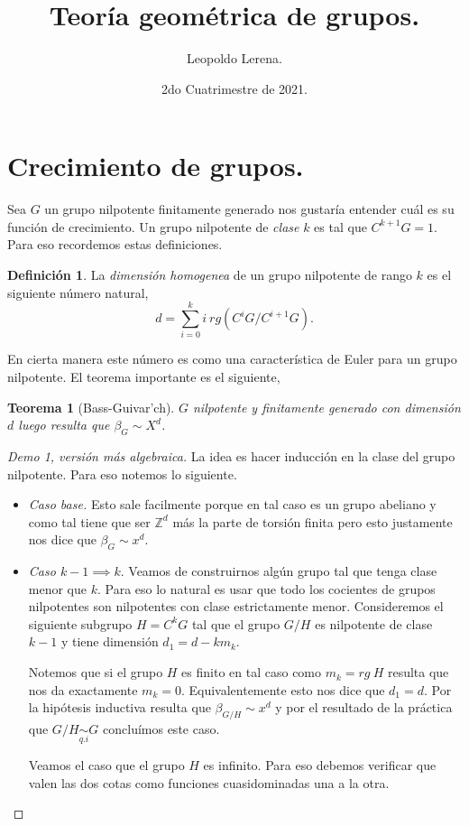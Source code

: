 \documentclass[11pt]{article}
\title{\color{red!55!black} Teoría geométrica de grupos.}
\author{Leopoldo Lerena.}
\date{2do Cuatrimestre de 2021.}
\theoremstyle{plain}
\newtheorem{teo}{Teorema}
\theoremstyle{definition}
\newtheorem*{deff}{Definición}
\theoremstyle{remark}
\newcommand\fg{finitamente generado }
\newcommand\ZZ{\mathbb{Z}}
\begin{document}
\maketitle
\section{Crecimiento de grupos.}
Sea $G$ un grupo nilpotente \fg nos gustaría entender cuál es su función de crecimiento. Un grupo nilpotente de \emph{clase} $k$ es tal que $C^{k+1} G = 1$. Para eso recordemos estas definiciones. 
\begin{deff}
	La \emph{dimensión homogenea} de un grupo nilpotente de rango $k$ es el siguiente número natural,
\begin{equation*}
	d = \sum_{i=0}^{k} i \ rg(C^i G/C^{i+1}G).
\end{equation*}
\end{deff}

En cierta manera este número es como una característica de Euler para un grupo nilpotente. El teorema importante es el siguiente,


\medskip
\begin{teo}[Bass-Guivar'ch]
	$G$ nilpotente y \fg con dimensión $d$ luego resulta que $\beta_G  \sim X^d$.
\end{teo}
\begin{proof}[Demo 1, versión más algebraica]
	La idea es hacer inducción en la clase del grupo nilpotente. Para eso notemos lo siguiente.
	\begin{itemize}
		\item \emph{Caso base.} Esto sale facilmente porque en tal caso es un grupo abeliano y como tal tiene que ser $\ZZ^d$ más la parte de torsión finita pero esto justamente nos dice que $\beta_G \sim x^d$. 
		\item \emph{Caso $k-1 \implies k$}. Veamos de construirnos algún grupo tal que tenga clase menor que $k$. Para eso lo natural es usar que todo los cocientes de grupos nilpotentes son nilpotentes con clase estrictamente menor. Consideremos el siguiente subgrupo $H=C^k G$ tal que el grupo $G/H$ es nilpotente de clase $k-1$ y tiene dimensión $d_1 = d - km_k$. 
		
		Notemos que si el grupo $H$ es finito en tal caso como $m_k = rg \  H$ resulta que nos da exactamente $m_k=0$. Equivalentemente esto nos dice que $d_1=d$. Por la hipótesis inductiva resulta que $\beta_{G/H} \sim x^d$ y por el resultado de la práctica que $G/H \underset{q.i}{\sim} G$ concluímos este caso.
		
		Veamos el caso que el grupo $H$ es infinito. Para eso debemos verificar que valen las dos cotas como funciones cuasidominadas una a la otra.
	\end{itemize}
\end{proof}



 
\end{document}
